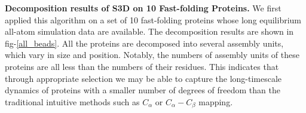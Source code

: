 \documentclass[12pt]{article}
\begin{document}
\setlength{\parindent}{0em}

{\bf Decomposition results of S3D on 10 Fast-folding Proteins.} We first applied this algorithm on a set of 10 fast-folding proteins whose long equilibrium all-atom simulation data are available\cite{DE_Shaw_fast-folding}. The decomposition results are shown in fig-\ref{all_beads}. All the proteins are decomposed into several assembly units, which vary in size and position. Notably, the numbers of assembly units of these proteins are all less than the numbers of their residues. This indicates that through appropriate selection we may be able to capture the long-timescale dynamics of proteins with a smaller number of degrees of freedom than the traditional intuitive methods such as $C_{\alpha}$ or $C_{\alpha}-C_{\beta}$ mapping.

\begin{figure}[htbp]
  \centering
  \\

\end{figure}
\end{document}
